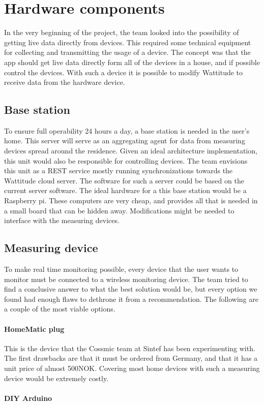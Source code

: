 \section{Hardware components}
In the very beginning of the project, the team looked into the possibility of getting live data directly from devices. This required some technical equipment for collecting and transmitting the usage of a device. The concept was that the app should get live data directly form all of the devices in a house, and if possible control the devices. With such a device it is possible to modify Wattitude to receive data from the hardware device.

\subsection{Base station}
To ensure full operability 24 hours a day, a base station is needed in the user's home. This server will serve as an aggregating agent for data from measuring devices spread around the residence. Given an ideal architecture implementation, this unit would also be responsible for controlling devices. The team envisions this unit as a REST service mostly running synchronizations towards the Wattitude cloud server. The software for such a server could be based on the current server software. The ideal hardware for a this base station would be a Raspberry pi. These computers are very cheap, and provides all that is needed in a small board that can be hidden away. Modifications might be needed to interface with the measuring devices. 

\subsection{Measuring device}
To make real time monitoring possible, every device that the user wants to monitor must be connected to a wireless monitoring device. The team tried to find a conclusive answer to what the best solution would be, but every option we found had enough flaws to dethrone it from a recommendation. The following are a couple of the most viable options.

\paragraph{HomeMatic plug}
This is the device that the Cossmic team at Sintef has been experimenting with. The first drawbacks are that it must be ordered from Germany, and that it has a unit price of almost 500NOK. Covering most home devices with such a measuring device would be extremely costly. 

\paragraph{DIY Arduino}